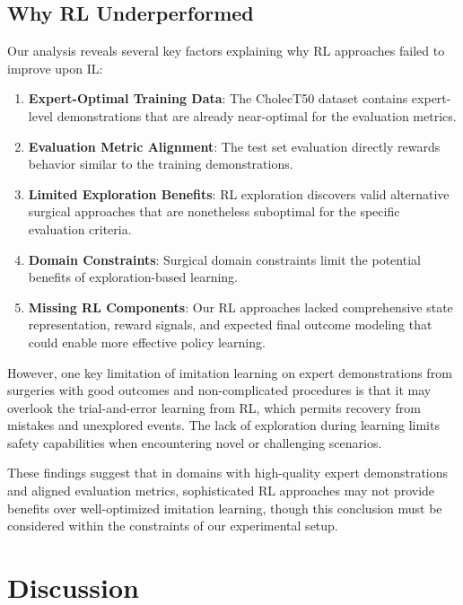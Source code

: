 \documentclass[runningheads]{llncs}
\begin{document}

\subsection{Why RL Underperformed}

Our analysis reveals several key factors explaining why RL approaches failed to improve upon IL:

\begin{enumerate}
\item \textbf{Expert-Optimal Training Data}: The CholecT50 dataset contains expert-level demonstrations that are already near-optimal for the evaluation metrics.
\item \textbf{Evaluation Metric Alignment}: The test set evaluation directly rewards behavior similar to the training demonstrations.
\item \textbf{Limited Exploration Benefits}: RL exploration discovers valid alternative surgical approaches that are nonetheless suboptimal for the specific evaluation criteria.
\item \textbf{Domain Constraints}: Surgical domain constraints limit the potential benefits of exploration-based learning.
\item \textbf{Missing RL Components}: Our RL approaches lacked comprehensive state representation, reward signals, and expected final outcome modeling that could enable more effective policy learning.
\end{enumerate}

However, one key limitation of imitation learning on expert demonstrations from surgeries with good outcomes and non-complicated procedures is that it may overlook the trial-and-error learning from RL, which permits recovery from mistakes and unexplored events. The lack of exploration during learning limits safety capabilities when encountering novel or challenging scenarios.

These findings suggest that in domains with high-quality expert demonstrations and aligned evaluation metrics, sophisticated RL approaches may not provide benefits over well-optimized imitation learning, though this conclusion must be considered within the constraints of our experimental setup.


\section{Discussion}
\end{document}
